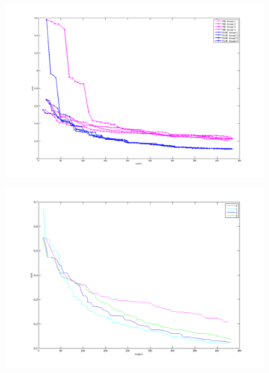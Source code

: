 \begin{figure}[tb]
  \includegraphics[width=\columnwidth]{figure/optical_flow_by_threads.png}
  \caption{}\label{fig:optical_flow_by_threads}
\end{figure}
\begin{figure}[tb]
  \includegraphics[width=\columnwidth]{figure/optical_flow_by_beta.png}
  \caption{}\label{fig:optical_flow_by_beta}
\end{figure}


